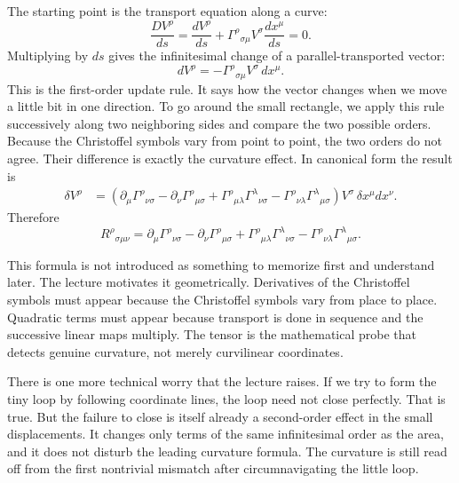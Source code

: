 The starting point is the transport equation along a curve:
\begin{equation}
\frac{D V^\rho}{ds}
=
\frac{dV^\rho}{ds}
+
\Gamma^\rho{}_{\sigma\mu}V^\sigma\frac{dx^\mu}{ds}
=
0.
\end{equation}
Multiplying by \(ds\) gives the infinitesimal change of a parallel-transported vector:
\begin{equation}
dV^\rho = -\Gamma^\rho{}_{\sigma\mu}V^\sigma\,dx^\mu.
\end{equation}
This is the first-order update rule. It says how the vector changes when we move a little bit in one direction. To go around the small rectangle, we apply this rule successively along two neighboring sides and compare the two possible orders. Because the Christoffel symbols vary from point to point, the two orders do not agree. Their difference is exactly the curvature effect. In canonical form the result is
\begin{align}
\delta V^\rho
&=
\left(
\partial_\mu \Gamma^\rho{}_{\nu\sigma}
-
\partial_\nu \Gamma^\rho{}_{\mu\sigma}
+
\Gamma^\rho{}_{\mu\lambda}\Gamma^\lambda{}_{\nu\sigma}
-
\Gamma^\rho{}_{\nu\lambda}\Gamma^\lambda{}_{\mu\sigma}
\right)
V^\sigma\,\delta x^\mu dx^\nu.
\end{align}
Therefore
\begin{equation}
R^\rho{}_{\sigma\mu\nu}
=
\partial_\mu \Gamma^\rho{}_{\nu\sigma}
-
\partial_\nu \Gamma^\rho{}_{\mu\sigma}
+
\Gamma^\rho{}_{\mu\lambda}\Gamma^\lambda{}_{\nu\sigma}
-
\Gamma^\rho{}_{\nu\lambda}\Gamma^\lambda{}_{\mu\sigma}.
\end{equation}

This formula is not introduced as something to memorize first and understand later. The lecture motivates it geometrically. Derivatives of the Christoffel symbols must appear because the Christoffel symbols vary from place to place. Quadratic terms must appear because transport is done in sequence and the successive linear maps multiply. The tensor is the mathematical probe that detects genuine curvature, not merely curvilinear coordinates.

There is one more technical worry that the lecture raises. If we try to form the tiny loop by following coordinate lines, the loop need not close perfectly. That is true. But the failure to close is itself already a second-order effect in the small displacements. It changes only terms of the same infinitesimal order as the area, and it does not disturb the leading curvature formula. The curvature is still read off from the first nontrivial mismatch after circumnavigating the little loop.

